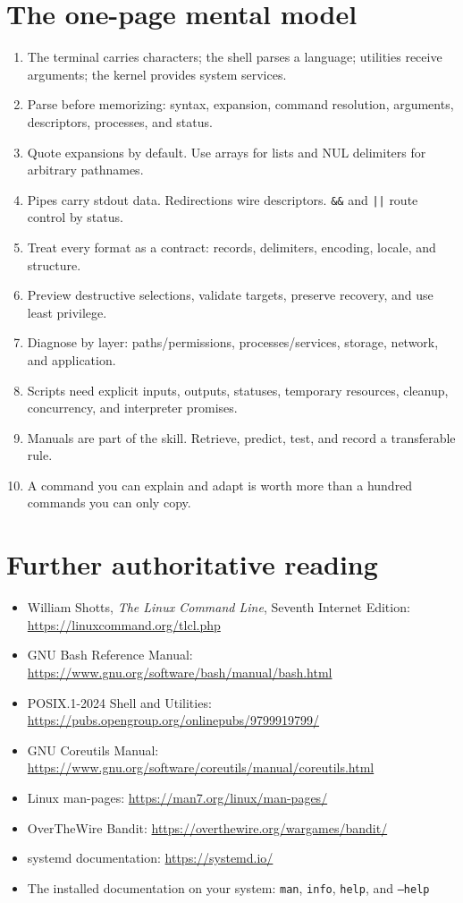 \documentclass[11pt,oneside,openany]{book}
\begin{document}
\section{The one-page mental model}
\begin{recapbox}[title={From syntax confusion to fluency}]
\begin{enumerate}
  \item The terminal carries characters; the shell parses a language; utilities receive arguments; the kernel provides system services.
  \item Parse before memorizing: syntax, expansion, command resolution, arguments, descriptors, processes, and status.
  \item Quote expansions by default. Use arrays for lists and NUL delimiters for arbitrary pathnames.
  \item Pipes carry stdout data. Redirections wire descriptors. \texttt{\&\&} and \texttt{||} route control by status.
  \item Treat every format as a contract: records, delimiters, encoding, locale, and structure.
  \item Preview destructive selections, validate targets, preserve recovery, and use least privilege.
  \item Diagnose by layer: paths/permissions, processes/services, storage, network, and application.
  \item Scripts need explicit inputs, outputs, statuses, temporary resources, cleanup, concurrency, and interpreter promises.
  \item Manuals are part of the skill. Retrieve, predict, test, and record a transferable rule.
  \item A command you can explain and adapt is worth more than a hundred commands you can only copy.
\end{enumerate}
\end{recapbox}

\section{Further authoritative reading}
\begin{itemize}
  \item William Shotts, \emph{The Linux Command Line}, Seventh Internet Edition: \url{https://linuxcommand.org/tlcl.php}
  \item GNU Bash Reference Manual: \url{https://www.gnu.org/software/bash/manual/bash.html}
  \item POSIX.1-2024 Shell and Utilities: \url{https://pubs.opengroup.org/onlinepubs/9799919799/}
  \item GNU Coreutils Manual: \url{https://www.gnu.org/software/coreutils/manual/coreutils.html}
  \item Linux man-pages: \url{https://man7.org/linux/man-pages/}
  \item OverTheWire Bandit: \url{https://overthewire.org/wargames/bandit/}
  \item systemd documentation: \url{https://systemd.io/}
  \item The installed documentation on your system: \texttt{man}, \texttt{info}, \texttt{help}, and \texttt{--help}
\end{itemize}
\end{document}
